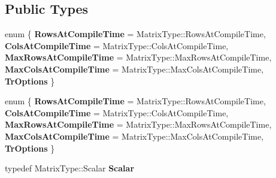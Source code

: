 \subsection*{Public Types}
\begin{DoxyCompactItemize}
\item 
\mbox{\label{class_eigen_1_1internal_1_1qr__preconditioner__impl_3_01_matrix_type_00_01_col_piv_householder_q9febbd0c27c13f65b619ca11d9f35cb8_a4279cfac7ccfb185a976337771b85494}} 
enum \{ \newline
{\bfseries Rows\+At\+Compile\+Time} = Matrix\+Type\+:\+:Rows\+At\+Compile\+Time, 
{\bfseries Cols\+At\+Compile\+Time} = Matrix\+Type\+:\+:Cols\+At\+Compile\+Time, 
{\bfseries Max\+Rows\+At\+Compile\+Time} = Matrix\+Type\+:\+:Max\+Rows\+At\+Compile\+Time, 
{\bfseries Max\+Cols\+At\+Compile\+Time} = Matrix\+Type\+:\+:Max\+Cols\+At\+Compile\+Time, 
\newline
{\bfseries Tr\+Options}
 \}
\item 
\mbox{\label{class_eigen_1_1internal_1_1qr__preconditioner__impl_3_01_matrix_type_00_01_col_piv_householder_q9febbd0c27c13f65b619ca11d9f35cb8_afee11f440b86f11dfb234aa442375e89}} 
enum \{ \newline
{\bfseries Rows\+At\+Compile\+Time} = Matrix\+Type\+:\+:Rows\+At\+Compile\+Time, 
{\bfseries Cols\+At\+Compile\+Time} = Matrix\+Type\+:\+:Cols\+At\+Compile\+Time, 
{\bfseries Max\+Rows\+At\+Compile\+Time} = Matrix\+Type\+:\+:Max\+Rows\+At\+Compile\+Time, 
{\bfseries Max\+Cols\+At\+Compile\+Time} = Matrix\+Type\+:\+:Max\+Cols\+At\+Compile\+Time, 
\newline
{\bfseries Tr\+Options}
 \}
\item 
\mbox{\label{class_eigen_1_1internal_1_1qr__preconditioner__impl_3_01_matrix_type_00_01_col_piv_householder_q9febbd0c27c13f65b619ca11d9f35cb8_a85b6c5ee23a5920211586a22d33c73a9}} 
typedef Matrix\+Type\+::\+Scalar {\bfseries Scalar}
\item 
\mbox{\label{class_eigen_1_1internal_1_1qr__preconditioner__impl_3_01_matrix_type_00_01_col_piv_householder_q9febbd0c27c13f65b619ca11d9f35cb8_a58578c89efb3fbe5e0356412694f873f}} 

\end{DoxyCompactItemize}
